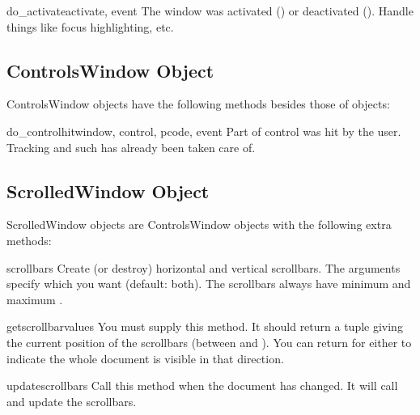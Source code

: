 \begin{methoddesc}{do_activate}{activate, event}
The window was activated () or deactivated
(). Handle things like focus highlighting,
etc.
\end{methoddesc}


\subsection{ControlsWindow Object \label{controlswindow-object}}

ControlsWindow objects have the following methods besides those of
 objects:


\begin{methoddesc}[ControlsWindow]{do_controlhit}{window, control,
                                                  pcode, event}
Part  of control  was hit by the
user. Tracking and such has already been taken care of.
\end{methoddesc}


\subsection{ScrolledWindow Object \label{scrolledwindow-object}}

ScrolledWindow objects are ControlsWindow objects with the following
extra methods:


\begin{methoddesc}[ScrolledWindow]{scrollbars}{}
Create (or destroy) horizontal and vertical scrollbars. The arguments
specify which you want (default: both). The scrollbars always have
minimum  and maximum .
\end{methoddesc}

\begin{methoddesc}[ScrolledWindow]{getscrollbarvalues}{}
You must supply this method. It should return a tuple  giving the current position of the scrollbars (between
 and ). You can return  for either to
indicate the whole document is visible in that direction.
\end{methoddesc}

\begin{methoddesc}[ScrolledWindow]{updatescrollbars}{}
Call this method when the document has changed. It will call
 and update the scrollbars.
\end{methoddesc}

